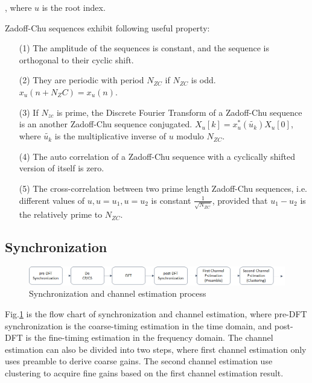 , where $u$ is the root index.

Zadoff-Chu sequences exhibit following useful property:
	
\begin{enumerate}[leftmargin=\leftmargin+\widthof{Prefix}]
\item[(1)] The amplitude of the sequences is constant, and the sequence is orthogonal to their cyclic shift.
\item[(2)]  They are periodic with period $N_{ZC}$ if $N_{ZC}$ is odd. $x_u (n+N_ZC )=x_u (n)$.
\item[(3)] If $N_{zc}$ is prime, the Discrete Fourier Transform of a Zadoff-Chu sequence is an another Zadoff-Chu sequence conjugated. $X_u [k]=x_{u}^{*} (\widetilde{u_k}) X_u [0]$, where $\widetilde{u_k}$ is the multiplicative inverse of $u$ modulo $N_{ZC}$.
\item[(4)] The auto correlation of a Zadoff-Chu sequence with a cyclically shifted version of itself is zero.
\item[(5)] The cross-correlation between two prime length Zadoff-Chu sequences, i.e. different values of $u, u=u_1, u=u_2$ is constant $\frac{1}{\sqrt{N_{ZC}}}$, provided that $u_1-u_2$ is the relatively prime to $N_{ZC}$.
\end{enumerate}

\subsection{Synchronization}

\begin{figure}[H]
 \centering
 \includegraphics[width=17cm]{fig/synchronization_process.png}
 \caption{Synchronization and channel estimation process}
 \label{fig:Synchronization_process}
\end{figure}

Fig.\ref{fig:Synchronization_process} is the flow chart of synchronization and channel estimation, where pre-DFT synchronization is the coarse-timing estimation in the time domain, and post-DFT is the fine-timing estimation in the frequency domain. The channel estimation can also be divided into two steps, where first channel estimation only uses preamble to derive coarse gains. The second channel estimation use clustering to acquire fine gains based on the first channel estimation result.


